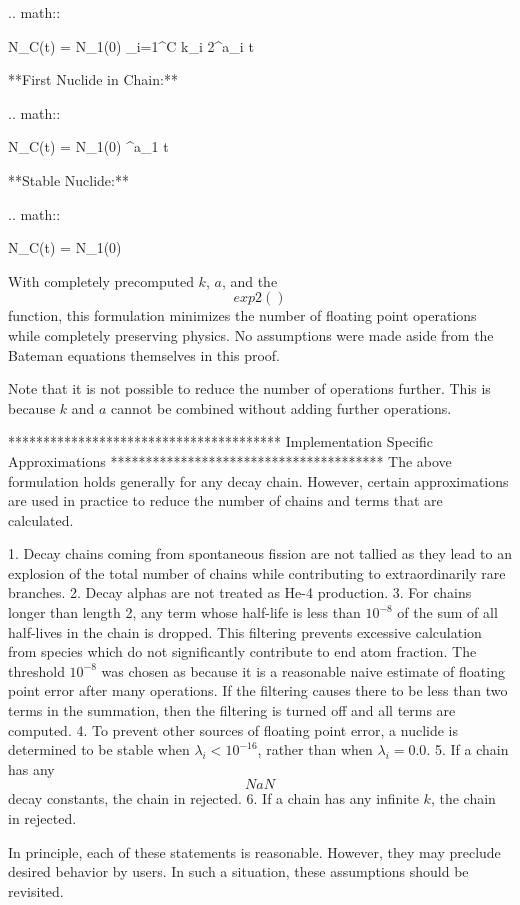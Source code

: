 \documentclass{anstrans}
\begin{document}
.. math:: 

    N_C(t) = N_1(0) \sum_{i=1}^C k_{i} 2^{a_i t}

**First Nuclide in Chain:**

.. math:: 

    N_C(t) = N_1(0) ^{a_1 t}

**Stable Nuclide:**

.. math:: 

    N_C(t) = N_1(0) \left[1.0 + \sum_{i=1}^{C-1} \lim_{\lambda_C\to 0}(k_{i}) \cdot 2^{a_i t} \right]


With completely precomputed $k$, $a$, and the $$exp2()$$ function, this 
formulation minimizes the number of floating point operations while completely 
preserving physics. No assumptions were made aside from the Bateman equations 
themselves in this proof.

Note that it is not possible to reduce the number of operations further.  This 
is because  $k$ and $a$ cannot be combined without adding further 
operations.

***************************************
Implementation Specific Approximations
***************************************
The above formulation holds generally for any decay chain.  However, certain 
approximations are used in practice to reduce the number of chains and terms 
that are calculated.

1. Decay chains coming from spontaneous fission are not tallied as they 
   lead to an explosion of the total number of chains while contributing to 
   extraordinarily rare branches.
2. Decay alphas are not treated as He-4 production.
3. For chains longer than length 2, any 
   term whose half-life is less than $10^{-8}$ of the sum of all 
   half-lives in the chain is dropped. This filtering prevents excessive
   calculation from species which do not significantly contribute to 
   end atom fraction. The threshold $10^{-8}$ was chosen as 
   because it is a reasonable naive estimate of floating point error after 
   many operations. If the filtering causes there to be less than 
   two terms in the summation, then the filtering is turned off and all
   terms are computed.
4. To prevent other sources of floating point error, a nuclide is determined 
   to be stable when $\lambda_i < 10^{-16}$, rather than when 
   $\lambda_i = 0.0$.
5. If a chain has any $$NaN$$ decay constants, the chain in rejected.
6. If a chain has any infinite $k$, the chain in rejected.

In principle, each of these statements is reasonable. However, they
may preclude desired behavior by users. In such a situation, these 
assumptions should be revisited.
\end{document}

